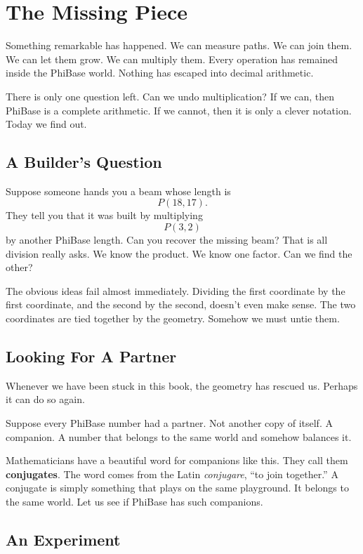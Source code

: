 \chapter{The Missing Piece}
\label{stone:division}

Something remarkable has happened. We can measure paths. We can join them. We can let them grow. We can multiply them. Every operation has remained inside the PhiBase world. Nothing has escaped into decimal arithmetic.

There is only one question left. Can we undo multiplication? If we can, then PhiBase is a complete arithmetic. If we cannot, then it is only a clever notation. Today we find out.

\section*{A Builder's Question}

Suppose someone hands you a beam whose length is
\[
P(18,17).
\]
They tell you that it was built by multiplying
\[
P(3,2)
\]
by another PhiBase length. Can you recover the missing beam? That is all division really asks. We know the product. We know one factor. Can we find the other?

The obvious ideas fail almost immediately. Dividing the first coordinate by the first coordinate, and the second by the second, doesn't even make sense. The two coordinates are tied together by the geometry. Somehow we must untie them.

\section*{Looking For A Partner}

Whenever we have been stuck in this book, the geometry has rescued us. Perhaps it can do so again.

Suppose every PhiBase number had a partner. Not another copy of itself. A companion. A number that belongs to the same world and somehow balances it.

Mathematicians have a beautiful word for companions like this. They call them \textbf{conjugates}. The word comes from the Latin \emph{conjugare}, ``to join together.'' A conjugate is simply something that plays on the same playground. It belongs to the same world. Let us see if PhiBase has such companions.

\section*{An Experiment}

